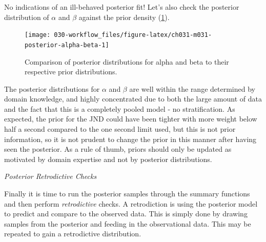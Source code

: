 \documentclass[11pt, oneside, openany]{scrbook}
\newenvironment{Shaded}{\begin{snugshade}}{\end{snugshade}}
\newcommand{\FloatTok}[1]{\textcolor[rgb]{0.00,0.00,0.81}{#1}}
\newcommand{\KeywordTok}[1]{\textcolor[rgb]{0.13,0.29,0.53}{\textbf{#1}}}
\newcommand{\NormalTok}[1]{#1}
\newcommand{\OperatorTok}[1]{\textcolor[rgb]{0.81,0.36,0.00}{\textbf{#1}}}
\newcommand{\StringTok}[1]{\textcolor[rgb]{0.31,0.60,0.02}{#1}}
\begin{document}
No indications of an ill-behaved posterior fit! Let's also check the posterior distribution of \(\alpha\) and \(\beta\) against the prior density (\ref{fig:ch031-m031-posterior-alpha-beta}).

\begin{figure}

{\centering \texttt{[image: 030-workflow\_files/figure-latex/ch031-m031-posterior-alpha-beta-1]} 

}

\caption{Comparison of posterior distributions for alpha and beta to their respective prior distributions.}\label{fig:ch031-m031-posterior-alpha-beta}
\end{figure}

The posterior distributions for \(\alpha\) and \(\beta\) are well within the range determined by domain knowledge, and highly concentrated due to both the large amount of data and the fact that this is a completely pooled model - no stratification. As expected, the prior for the JND could have been tighter with more weight below half a second compared to the one second limit used, but this is not prior information, so it is not prudent to change the prior in this manner after having seen the posterior. As a rule of thumb, priors should only be updated as motivated by domain expertise and not by posterior distributions.

\emph{Posterior Retrodictive Checks}

Finally it is time to run the posterior samples through the summary functions and then perform \emph{retrodictive} checks. A retrodiction is using the posterior model to predict and compare to the observed data. This is simply done by drawing samples from the posterior and feeding in the observational data. This may be repeated to gain a retrodictive distribution.


\begin{Shaded}
\end{Shaded}
\end{document}
